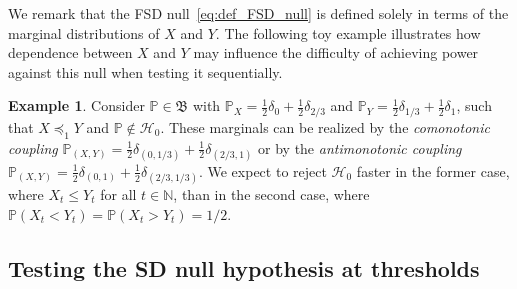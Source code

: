 \documentclass[12pt,twoside]{article}
\theoremstyle{plain}
\theoremstyle{definition}
\newtheorem{example}{Example}
\theoremstyle{remark}
\newcommand{\N}{\mathbb{N}}
\newcommand{\calH}{\mathcal{H}}
\newcommand{\Psymb}{\mathbb{P}}
\newcommand{\frakB}{\mathfrak{B}}
\newcommand{\fsd}{\preceq_{1}}
\begin{document}
We remark that the FSD null~\eqref{eq:def_FSD_null} is defined solely in terms of the marginal distributions of $X$ and $Y$.
The following toy example illustrates how dependence between $X$ and $Y$ may influence the difficulty of achieving power against this null when testing it sequentially. 
\begin{example}
\label{ex:anticorr}
Consider $\Psymb \in \frakB$ with 
$\mathbb{P}_X=\frac{1}{2}\delta_{0}+\frac{1}{2}\delta_{{2/3}}$ and 
$\mathbb{P}_Y=\frac{1}{2}\delta_{1/3}+\frac{1}{2}\delta_{1}$, such that $X \fsd Y$ and $\Psymb \notin \calH_0$. 
These marginals can be realized by the \emph{comonotonic coupling} $\mathbb{P}_{(X,Y)} =\frac{1}{2}\delta_{(0, 1/3)} + \frac{1}{2}\delta_{(2/3, 1)}$ or by the \emph{antimonotonic coupling} $\mathbb{P}_{(X,Y)} = \frac{1}{2}\delta_{(0, 1)} + \frac{1}{2}\delta_{(2/3, 1/3)}$. 
We expect to reject $\calH_0$ faster in the former case, where $X_t\leq Y_t$ for all $t \in \N$, than in the second case, where $\mathbb{P}(X_t<Y_t)=\mathbb{P}(X_t>Y_t)=1/2$. 
\end{example}


\subsection{Testing the SD null hypothesis at thresholds}
\end{document}
